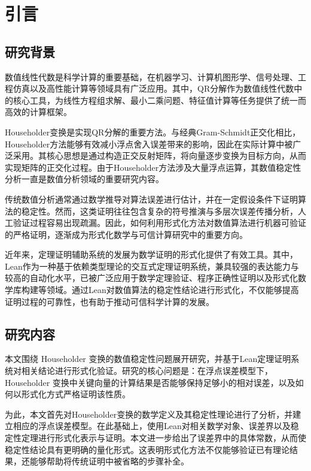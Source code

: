 \documentclass[UTF8,a4paper,openany]{ctexbook}
\begin{document}

\tableofcontents

\clearpage
{}

\chapter{引言}

\section{研究背景}

数值线性代数是科学计算的重要基础，在机器学习、计算机图形学、信号处理、工程仿真以及高性能计算等领域具有广泛应用。其中，QR分解作为数值线性代数中的核心工具，为线性方程组求解、最小二乘问题、特征值计算等任务提供了统一而高效的计算框架。

Householder变换是实现QR分解的重要方法。与经典Gram-Schmidt正交化相比，Householder方法能够有效减小浮点舍入误差带来的影响，因此在实际计算中被广泛采用。其核心思想是通过构造正交反射矩阵，将向量逐步变换为目标方向，从而实现矩阵的正交化过程。由于Householder方法涉及大量浮点运算，其数值稳定性分析一直是数值分析领域的重要研究内容。

传统数值分析通常通过数学推导对算法误差进行估计，并在一定假设条件下证明算法的稳定性。然而，这类证明往往包含复杂的符号推演与多层次误差传播分析，人工验证过程容易出现疏漏。因此，如何利用形式化方法对数值算法进行机器可验证的严格证明，逐渐成为形式化数学与可信计算研究中的重要方向。

近年来，定理证明辅助系统的发展为数学证明的形式化提供了有效工具。其中，Lean作为一种基于依赖类型理论的交互式定理证明系统，兼具较强的表达能力与较高的自动化水平，已被广泛应用于数学定理验证、程序正确性证明以及形式化数学库构建等领域。通过Lean对数值算法的稳定性结论进行形式化，不仅能够提高证明过程的可靠性，也有助于推动可信科学计算的发展。

\section{研究内容}

本文围绕 Householder 变换的数值稳定性问题展开研究，并基于Lean定理证明系统对相关结论进行形式化验证。研究的核心问题是：在浮点误差模型下，Householder 变换中关键向量的计算结果是否能够保持足够小的相对误差，以及如何以形式化方式严格证明该性质。

为此，本文首先对Householder变换的数学定义及其稳定性理论进行了分析，并建立相应的浮点误差模型。在此基础上，使用Lean对相关数学对象、误差界以及稳定性定理进行形式化表示与证明。本文进一步给出了误差界中的具体常数，从而使稳定性结论具有更明确的量化形式。这表明形式化方法不仅能够验证已有理论结果，还能够帮助将传统证明中被省略的步骤补全。
\end{document}
